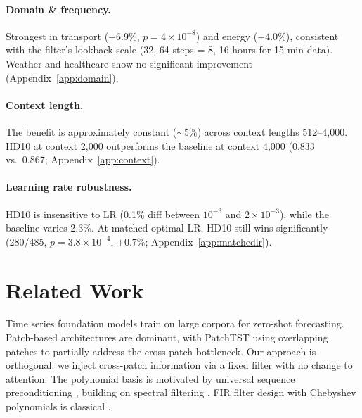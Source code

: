 \documentclass{article}
\begin{document}
\paragraph{Domain \& frequency.} Strongest in transport ($+6.9\%$, $p{=}4{\times}10^{-8}$) and energy ($+4.0\%$), consistent with the filter's lookback scale (32, 64 steps = 8, 16 hours for 15-min data). Weather and healthcare show no significant improvement (Appendix~\ref{app:domain}).

\paragraph{Context length.} The benefit is approximately constant (${\sim}5\%$) across context lengths 512--4,000. HD10 at context 2,000 outperforms the baseline at context 4,000 (0.833 vs.\ 0.867; Appendix~\ref{app:context}).

\paragraph{Learning rate robustness.} HD10 is insensitive to LR (0.1\% diff between $10^{-3}$ and $2{\times}10^{-3}$), while the baseline varies 2.3\%. At matched optimal LR, HD10 still wins significantly (280/485, $p{=}3.8{\times}10^{-4}$, $+0.7\%$; Appendix~\ref{app:matchedlr}).

\section{Related Work}

Time series foundation models \citep{woo2024unified,liu2024moirai2,das2024decoder,ansari2024chronos,goswami2024moment} train on large corpora for zero-shot forecasting. Patch-based architectures \citep{nie2023patchtst,dosovitskiy2021image} are dominant, with PatchTST using overlapping patches to partially address the cross-patch bottleneck. Our approach is orthogonal: we inject cross-patch information via a fixed filter with no change to attention. The polynomial basis is motivated by universal sequence preconditioning \citep{marsden2024universal}, building on spectral filtering \citep{hazan2017learning,hazan2018spectral}. FIR filter design with Chebyshev polynomials is classical \citep{parks1972chebyshev,oppenheim1999discrete}.

\end{document}
